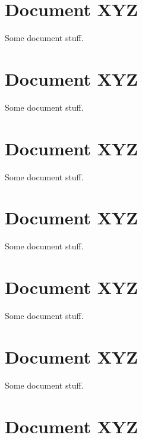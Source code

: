 \documentclass[oneside]{book}
\begin{document}
\chapter{Document XYZ}

Some document stuff.


\chapter{Document XYZ}

Some document stuff.


\chapter{Document XYZ}

Some document stuff.


\chapter{Document XYZ}

Some document stuff.


\chapter{Document XYZ}

Some document stuff.


\chapter{Document XYZ}

Some document stuff.


\chapter{Document XYZ}
\end{document}
